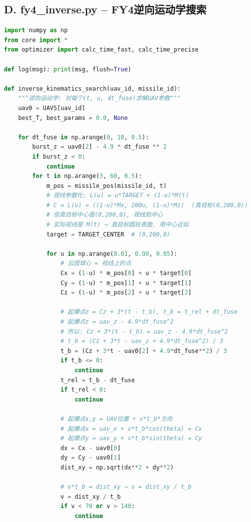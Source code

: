 \documentclass[12pt,a4paper]{article}
\begin{document}
\subsection{D. fy4\_inverse.py -- FY4逆向运动学搜索}
\begin{lstlisting}[language=Python, caption={D. fy4\_inverse.py}]
import numpy as np
from core import *
from optimizer import calc_time_fast, calc_time_precise

def log(msg): print(msg, flush=True)

def inverse_kinematics_search(uav_id, missile_id):
    """逆向运动学: 对每个(t, u, dt_fuse)求解UAV参数"""
    uav0 = UAVS[uav_id]
    best_T, best_params = 0.0, None

    for dt_fuse in np.arange(0, 10, 0.5):
        burst_z = uav0[2] - 4.9 * dt_fuse ** 2
        if burst_z < 0:
            continue
        for t in np.arange(3, 60, 0.5):
            m_pos = missile_pos(missile_id, t)
            # 视线参数化: L(u) = u*TARGET + (1-u)*M(t)
            # C = L(u) = ((1-u)*Mx, 200u, (1-u)*Mz)  (真目标(0,200,0))
            # 但真目标中心是(0,200,0), 视线到中心
            # 实际视线是 M(t) → 真目标圆柱表面, 用中心近似
            target = TARGET_CENTER  # (0,200,0)

            for u in np.arange(0.01, 0.99, 0.05):
                # 云团球心 = 视线上的点
                Cx = (1-u) * m_pos[0] + u * target[0]
                Cy = (1-u) * m_pos[1] + u * target[1]
                Cz = (1-u) * m_pos[2] + u * target[2]

                # 起爆点z = Cz + 3*(t - t_b), t_b = t_rel + dt_fuse
                # 起爆点z = uav_z - 4.9*dt_fuse^2
                # 所以: Cz + 3*(t - t_b) = uav_z - 4.9*dt_fuse^2
                # t_b = (Cz + 3*t - uav_z + 4.9*dt_fuse^2) / 3
                t_b = (Cz + 3*t - uav0[2] + 4.9*dt_fuse**2) / 3
                if t_b <= 0:
                    continue
                t_rel = t_b - dt_fuse
                if t_rel < 0:
                    continue

                # 起爆点x,y = UAV位置 + v*t_b*方向
                # 起爆点x = uav_x + v*t_b*cos(theta) = Cx
                # 起爆点y = uav_y + v*t_b*sin(theta) = Cy
                dx = Cx - uav0[0]
                dy = Cy - uav0[1]
                dist_xy = np.sqrt(dx**2 + dy**2)

                # v*t_b = dist_xy → v = dist_xy / t_b
                v = dist_xy / t_b
                if v < 70 or v > 140:
                    continue


\end{lstlisting}
\end{document}
